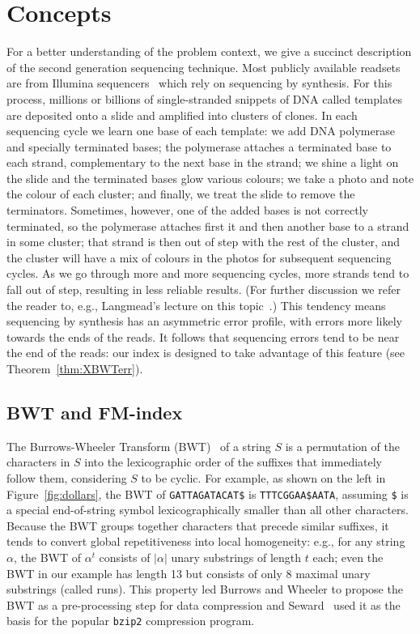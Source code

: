 \section{Concepts} \label{xbwt:sec:concepts}

{For a better understanding of the problem context, we give a succinct description of the second generation sequencing technique.} Most publicly available readsets are from Illumina sequencers~\cite{kodama2012sequence} which rely on sequencing by synthesis.  For this process, millions or billions of single-stranded snippets of DNA called templates are deposited onto a slide and amplified into clusters of clones.  In each sequencing cycle we learn one base of each template: we add DNA polymerase and specially terminated bases; the polymerase attaches a terminated base to each strand, complementary to the next base in the strand; we shine a light on the slide and the terminated bases glow various colours; we take a photo and note the colour of each cluster; and finally, we treat the slide to remove the terminators.  Sometimes, however, one of the added bases is not correctly terminated, so the polymerase attaches first it and then another base to a strand in some cluster; that strand is then out of step with the rest of the cluster, and the cluster will have a mix of colours in the photos for subsequent sequencing cycles.  As we go through more and more sequencing cycles, more strands tend to fall out of step, resulting in less reliable results.  (For further discussion we refer the reader to, e.g., Langmead's lecture on this topic~\cite{LangmeadVideo}.)  This tendency means sequencing by synthesis has an asymmetric error profile, with errors more likely towards the ends of the reads.  It follows that sequencing errors tend to be near the end of the reads: our index is designed to take advantage of this feature (see Theorem~\ref{thm:XBWTerr}).



\subsection{BWT and FM-index}
\label{subsec:BWT}

The Burrows-Wheeler Transform (BWT)~\cite{burrows1994block} of a string $S$ is a permutation of the characters in $S$ into the lexicographic order of the suffixes that immediately follow them, considering $S$ to be cyclic.  For example, as shown on the left in Figure~\ref{fig:dollars}, the BWT of {\tt GATTAGATACAT\$} is {\tt TTTCGGAA\$AATA}, assuming {\tt \$} is a special end-of-string symbol lexicographically smaller than all other characters.  Because the BWT groups together characters that precede similar suffixes, it tends to convert global repetitiveness into local homogeneity: e.g., for any string $\alpha$, the BWT of $\alpha^t$ consists of $|\alpha|$ unary substrings of length $t$ each; even the BWT in our example has length 13 but consists of only 8 maximal unary substrings (called runs).  This property led Burrows and Wheeler to propose the BWT as a pre-processing step for data compression and Seward~\cite{seward1996bzip2} used it as the basis for the popular {\tt bzip2} compression program.

